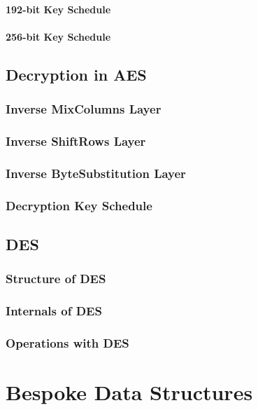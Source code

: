 \paragraph{192-bit Key Schedule}
\paragraph{256-bit Key Schedule}

\subsection{Decryption in AES}

\subsubsection{Inverse MixColumns Layer}

\subsubsection{Inverse ShiftRows Layer}

\subsubsection{Inverse ByteSubstitution Layer}

\subsubsection{Decryption Key Schedule}



\subsection{DES}
\subsubsection{Structure of DES}
\subsubsection{Internals of DES}
\subsubsection{Operations with DES}

\section{Bespoke Data Structures}

